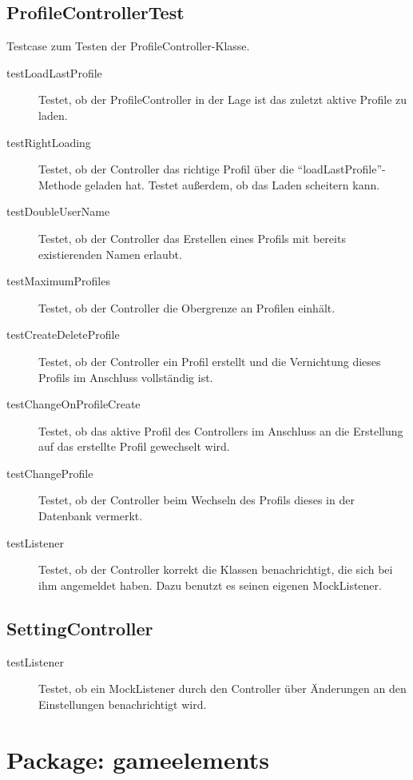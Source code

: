 \documentclass[parskip=full]{scrreprt}
\begin{document}
\subsection{ProfileControllerTest}

Testcase zum Testen der ProfileController-Klasse.

\begin{description}
	\item[testLoadLastProfile] Testet, ob der ProfileController in der Lage ist das zuletzt aktive Profile zu laden.
	\item[testRightLoading] Testet, ob der Controller das richtige Profil über die \enquote{loadLastProfile}-Methode geladen hat. Testet außerdem, ob das Laden scheitern kann.
	\item[testDoubleUserName] Testet, ob der Controller das Erstellen eines Profils mit bereits existierenden Namen erlaubt.
	\item[testMaximumProfiles] Testet, ob der Controller die Obergrenze an Profilen einhält.
	\item[testCreateDeleteProfile] Testet, ob der Controller ein Profil erstellt und die Vernichtung dieses Profils im Anschluss vollständig ist.
	\item[testChangeOnProfileCreate] Testet, ob das aktive Profil des Controllers im Anschluss an die Erstellung auf das erstellte Profil gewechselt wird.
	\item[testChangeProfile] Testet, ob der Controller beim Wechseln des Profils dieses in der Datenbank vermerkt.
	\item[testListener] Testet, ob der Controller korrekt die Klassen benachrichtigt, die sich bei ihm angemeldet haben. Dazu benutzt es seinen eigenen MockListener.
\end{description}

\subsection{SettingController}

\begin{description}
	\item [testListener] Testet, ob ein MockListener durch den Controller über Änderungen an den Einstellungen benachrichtigt wird.
\end{description}

\section{Package: gameelements}
\end{document}
